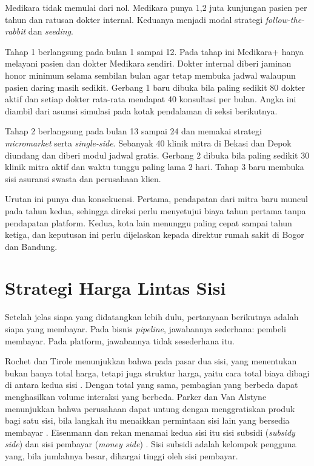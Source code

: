 \begin{kasus}[title={Kasus Medikara Health: Memulai dari Sisi Internal}]
Medikara tidak memulai dari nol. Medikara punya 1,2 juta kunjungan pasien per
tahun dan ratusan dokter internal. Keduanya menjadi modal strategi
\textit{follow-the-rabbit} dan \textit{seeding}.

Tahap 1 berlangsung pada bulan 1 sampai 12. Pada tahap ini Medikara+ hanya
melayani pasien dan dokter Medikara sendiri. Dokter internal diberi jaminan
honor minimum selama sembilan bulan agar tetap membuka jadwal walaupun pasien
daring masih sedikit. Gerbang 1 baru dibuka bila paling sedikit 80 dokter aktif
dan setiap dokter rata-rata mendapat 40 konsultasi per bulan. Angka ini diambil
dari asumsi simulasi pada kotak pendalaman di seksi berikutnya.

Tahap 2 berlangsung pada bulan 13 sampai 24 dan memakai strategi
\textit{micromarket} serta \textit{single-side}. Sebanyak 40 klinik mitra di
Bekasi dan Depok diundang dan diberi modul jadwal gratis. Gerbang 2 dibuka bila
paling sedikit 30 klinik mitra aktif dan waktu tunggu paling lama 2 hari.
Tahap 3 baru membuka sisi asuransi swasta dan perusahaan klien.

Urutan ini punya dua konsekuensi. Pertama, pendapatan dari mitra baru muncul
pada tahun kedua, sehingga direksi perlu menyetujui biaya tahun pertama tanpa
pendapatan platform. Kedua, kota lain menunggu paling cepat sampai tahun ketiga,
dan keputusan ini perlu dijelaskan kepada direktur rumah sakit di Bogor dan
Bandung.
\end{kasus}

\section{Strategi Harga Lintas Sisi}

Setelah jelas siapa yang didatangkan lebih dulu, pertanyaan berikutnya adalah
siapa yang membayar. Pada bisnis \textit{pipeline}, jawabannya sederhana:
pembeli membayar. Pada platform, jawabannya tidak sesederhana itu.

Rochet dan Tirole menunjukkan bahwa pada pasar dua sisi, yang menentukan bukan
hanya total harga, tetapi juga struktur harga, yaitu cara total biaya dibagi
di antara kedua sisi \cite{rochet2003platform}. Dengan total yang sama,
pembagian yang berbeda dapat menghasilkan volume interaksi yang berbeda. Parker
dan Van Alstyne menunjukkan bahwa perusahaan dapat untung dengan menggratiskan
produk bagi satu sisi, bila langkah itu menaikkan permintaan sisi lain yang
bersedia membayar \cite{parker2005twosided}. Eisenmann dan rekan menamai
kedua sisi itu sisi subsidi (\textit{subsidy side}) dan sisi pembayar
(\textit{money side}) \cite{eisenmann2006strategies}. Sisi subsidi adalah
kelompok pengguna yang, bila jumlahnya besar, dihargai tinggi oleh sisi
pembayar.

